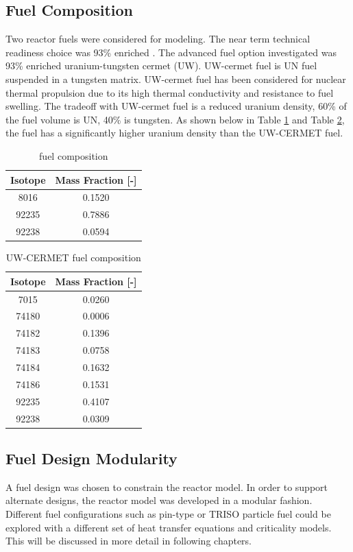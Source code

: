 \subsection{Fuel Composition}
Two reactor fuels were considered for modeling. The near term technical
readiness choice was 93\% enriched \uox. The advanced fuel option investigated
was 93\% enriched uranium-tungsten cermet (UW). UW-cermet fuel is UN fuel suspended in a
tungsten matrix. UW-cermet fuel has been considered for nuclear thermal
propulsion due to its high thermal conductivity and resistance to fuel swelling.
The tradeoff with UW-cermet fuel is a reduced uranium density, 60\% of the fuel
volume is UN, 40\% is tungsten. As shown below in Table \ref{tab:uox_comp} and
Table \ref{tab:uw_comp}, the \uox fuel has a significantly higher uranium
density than the UW-CERMET fuel.

\begin{table}[h]
  \centering
  \caption{\uox fuel composition}
  \begin{tabular}{cc}
    \toprule
    Isotope   & Mass Fraction [-] \\
    \midrule
     8016     & 0.1520 \\
    92235     & 0.7886 \\
    92238     & 0.0594 \\
  \end{tabular}
  \label{tab:uox_comp}
\end{table}
    
\begin{table}[h]
  \centering
  \caption{UW-CERMET fuel composition}
  \begin{tabular}{cc}
    \toprule
    Isotope   & Mass Fraction [-] \\
    \midrule
     7015     &  0.0260 \\
     74180    &  0.0006 \\ 
     74182    &  0.1396 \\
     74183    &  0.0758 \\
     74184    &  0.1632 \\
     74186    &  0.1531 \\
     92235    &  0.4107 \\
     92238    &  0.0309 \\
  \end{tabular}
  \label{tab:uw_comp}
\end{table}

\newpage

\subsection{Fuel Design Modularity}
A fuel design was chosen to constrain the reactor model. In order to support
alternate designs, the reactor model was developed in a modular fashion.
Different fuel configurations such as pin-type or TRISO particle fuel could be
explored with a different set of heat transfer equations and criticality models.
This will be discussed in more detail in following chapters.


